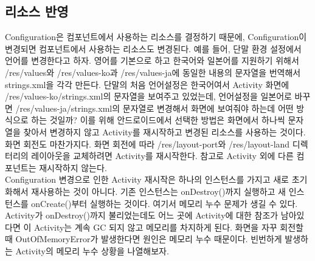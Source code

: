 \subsection{리소스 반영}
Configuration은 컴포넌트에서 사용하는 리소스를 결정하기 때문에,  Configuration이 변경되면 컴포넌트에서 사용하는 리소스도 변경된다. 
예를 들어, 단말 환경 설정에서 언어를 변경한다고 하자. 
영어를 기본으로 하고 한국어와 일본어를 지원하기 위해서 /res/values와 /res/values-ko과 /res/values-ja에 동일한 내용의 문자열을 번역해서 strings.xml을 각각 만든다. 단말의 처음 언어설정은 한국어여서 Activity 화면에 /res/values-ko/strings.xml의 문자열을 보여주고 있었는데, 언어설정을 일본어로 바꾸면 /res/values-ja/strings.xml의 문자열로 변경해서 화면에 보여줘야 하는데 어떤 방식으로 하는 것일까?
이를 위해 안드로이드에서 선택한 방법은 화면에서 하나씩 문자열을 찾아서 변경하지 않고 Activity를 재시작하고 변경된 리소스를 사용하는 것이다.
화면 회전도 마찬가지다. 화면 회전에 따라 /res/layout-port와 /res/layout-land 디렉터리의 레이아웃을 교체하려면 Activity를 재시작한다. 참고로 Activity 외에 다른 컴포넌트는 재시작하지 않는다.\\

Configuration 변경으로 인한 Activity 재시작은 하나의 인스턴스를 가지고 새로 초기화해서 재사용하는 것이 아니다. 기존 인스턴스는 onDestroy()까지 실행하고 새 인스턴스를 onCreate()부터 실행하는 것이다. 여기서 메모리 누수 문제가 생길 수 있다. Activity가 onDestroy()까지 불리었는데도 어느 곳에 Activity에 대한 참조가 남아있다면 이 Activity는 계속 GC 되지 않고 메모리를 차지하게 된다. 화면을 자꾸 회전할 때 OutOfMemoryError가 발생한다면 원인은 메모리 누수 때문이다. 빈번하게 발생하는 Activity의 메모리 누수 상황을 나열해보자.

